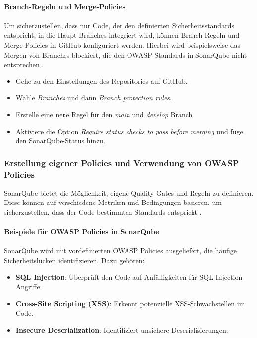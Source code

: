 \paragraph{Branch-Regeln und Merge-Policies}

Um sicherzustellen, dass nur Code, der den definierten Sicherheitsstandards entspricht, in die Haupt-Branches integriert wird, können Branch-Regeln und Merge-Policies in GitHub konfiguriert werden. Hierbei wird beispielsweise das Mergen von Branches blockiert, die den OWASP-Standards in SonarQube nicht entsprechen \cite{Foundation2023}.

\begin{itemize}
    \item Gehe zu den Einstellungen des Repositories auf GitHub.
    \item Wähle \textit{Branches} und dann \textit{Branch protection rules}.
    \item Erstelle eine neue Regel für den \textit{main} und \textit{develop} Branch.
    \item Aktiviere die Option \textit{Require status checks to pass before merging} und füge den SonarQube-Status hinzu.
\end{itemize}

\subsubsection{Erstellung eigener Policies und Verwendung von OWASP Policies}

SonarQube bietet die Möglichkeit, eigene Quality Gates und Regeln zu definieren. Diese können auf verschiedene Metriken und Bedingungen basieren, um sicherzustellen, dass der Code bestimmten Standards entspricht \cite{SonarSource2023}.

\paragraph{Beispiele für OWASP Policies in SonarQube}

SonarQube wird mit vordefinierten OWASP Policies ausgeliefert, die häufige Sicherheitslücken identifizieren. Dazu gehören:

\begin{itemize}
    \item \textbf{SQL Injection}: Überprüft den Code auf Anfälligkeiten für SQL-Injection-Angriffe.
    \item \textbf{Cross-Site Scripting (XSS)}: Erkennt potenzielle XSS-Schwachstellen im Code.
    \item \textbf{Insecure Deserialization}: Identifiziert unsichere Deserialisierungen.
\end{itemize}

